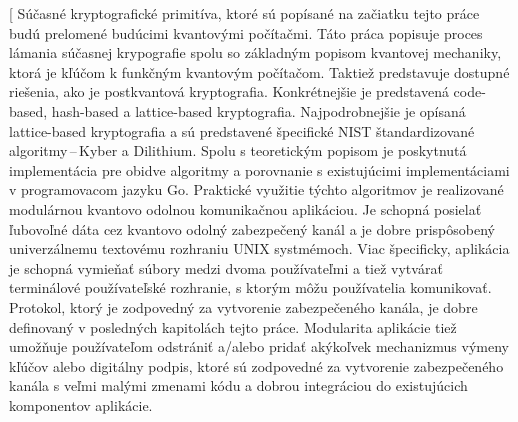 
\date{7.\,6.\,2023}


\abstract[%
  Súčasné kryptografické primitíva, ktoré sú popísané na začiatku tejto práce budú prelomené budúcimi kvantovými počítačmi. Táto práca popisuje proces lámania súčasnej krypografie spolu so základným popisom kvantovej mechaniky, ktorá je kľúčom k funkčným kvantovým počítačom. Taktiež predstavuje dostupné riešenia, ako je postkvantová kryptografia. Konkrétnejšie je predstavená code-based, hash-based a lattice-based kryptografia. Najpodrobnejšie je opísaná lattice-based kryptografia a sú predstavené špecifické NIST štandardizované algoritmy\,--\,Kyber a Dilithium. Spolu s teoretickým popisom je poskytnutá implementácia pre obidve algoritmy a porovnanie s existujúcimi implementáciami v programovacom jazyku Go. Praktické využitie týchto algoritmov je realizované modulárnou kvantovo odolnou komunikačnou aplikáciou. Je schopná posielať ľubovoľné dáta cez kvantovo odolný zabezpečený kanál a je dobre prispôsobený univerzálnemu textovému rozhraniu UNIX systmémoch. Viac špecificky, aplikácia je schopná vymieňať súbory medzi dvoma používateľmi a tiež vytvárať terminálové používateľské rozhranie, s ktorým môžu používatelia komunikovať. Protokol, ktorý je zodpovedný za vytvorenie zabezpečeného kanála, je dobre definovaný v posledných kapitolách tejto práce. Modularita aplikácie tiež umožňuje používateľom odstrániť a/alebo pridať akýkoľvek mechanizmus výmeny kľúčov alebo digitálny podpis, ktoré sú zodpovedné za vytvorenie zabezpečeného kanála s veľmi malými zmenami kódu a dobrou integráciou do existujúcich komponentov aplikácie.
